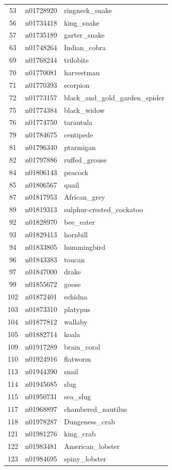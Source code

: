 \begin{table}
\begin{tabular}{cll}
53 & n01728920 & ringneck_snake \\
56 & n01734418 & king_snake \\
57 & n01735189 & garter_snake \\
63 & n01748264 & Indian_cobra \\
69 & n01768244 & trilobite \\
70 & n01770081 & harvestman \\
71 & n01770393 & scorpion \\
72 & n01773157 & black_and_gold_garden_spider \\
75 & n01774384 & black_widow \\
76 & n01774750 & tarantula \\
79 & n01784675 & centipede \\
81 & n01796340 & ptarmigan \\
82 & n01797886 & ruffed_grouse \\
84 & n01806143 & peacock \\
85 & n01806567 & quail \\
87 & n01817953 & African_grey \\
89 & n01819313 & sulphur-crested_cockatoo \\
92 & n01828970 & bee_eater \\
93 & n01829413 & hornbill \\
94 & n01833805 & hummingbird \\
96 & n01843383 & toucan \\
97 & n01847000 & drake \\
99 & n01855672 & goose \\
102 & n01872401 & echidna \\
103 & n01873310 & platypus \\
104 & n01877812 & wallaby \\
105 & n01882714 & koala \\
109 & n01917289 & brain_coral \\
110 & n01924916 & flatworm \\
113 & n01944390 & snail \\
114 & n01945685 & slug \\
115 & n01950731 & sea_slug \\
117 & n01968897 & chambered_nautilus \\
118 & n01978287 & Dungeness_crab \\
121 & n01981276 & king_crab \\
122 & n01983481 & American_lobster \\
123 & n01984695 & spiny_lobster \\

\end{tabular}
\end{table}
